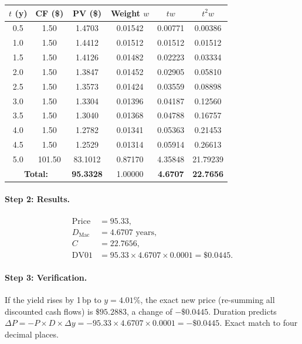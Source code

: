 \begin{center}
\small
\begin{tabular}{cccccc}
\toprule
$t$ (y) & CF (\$) & PV (\$) & Weight $w$ & $tw$ & $t^2 w$ \\
\midrule
0.5 &   1.50 &  1.4703 & 0.01542 & 0.00771 & 0.00386 \\
1.0 &   1.50 &  1.4412 & 0.01512 & 0.01512 & 0.01512 \\
1.5 &   1.50 &  1.4126 & 0.01482 & 0.02223 & 0.03334 \\
2.0 &   1.50 &  1.3847 & 0.01452 & 0.02905 & 0.05810 \\
2.5 &   1.50 &  1.3573 & 0.01424 & 0.03559 & 0.08898 \\
3.0 &   1.50 &  1.3304 & 0.01396 & 0.04187 & 0.12560 \\
3.5 &   1.50 &  1.3040 & 0.01368 & 0.04788 & 0.16757 \\
4.0 &   1.50 &  1.2782 & 0.01341 & 0.05363 & 0.21453 \\
4.5 &   1.50 &  1.2529 & 0.01314 & 0.05914 & 0.26613 \\
5.0 & 101.50 & 83.1012 & 0.87170 & 4.35848 & 21.79239 \\
\midrule
\multicolumn{2}{c}{\textbf{Total:}} & \textbf{95.3328} & 1.00000
  & \textbf{4.6707} & \textbf{22.7656} \\
\bottomrule
\end{tabular}
\end{center}

\paragraph{Step 2: Results.}
\begin{align}
  \text{Price} &= 95.33, \\
  D_{\text{Mac}} &= 4.6707 \text{ years}, \\
  C &= 22.7656, \\
  \text{DV01} &= 95.33 \times 4.6707 \times 0.0001
    = \$0.0445.
\end{align}

\paragraph{Step 3: Verification.}
If the yield rises by 1\,bp to $y = 4.01\%$, the exact new price
(re-summing all discounted cash flows) is $\$95.2883$, a change of
$-\$0.0445$.  Duration predicts
$\Delta P = -P \times D \times \Delta y = -95.33 \times 4.6707 \times
0.0001 = -\$0.0445$.  Exact match to four decimal places. \checkmark

